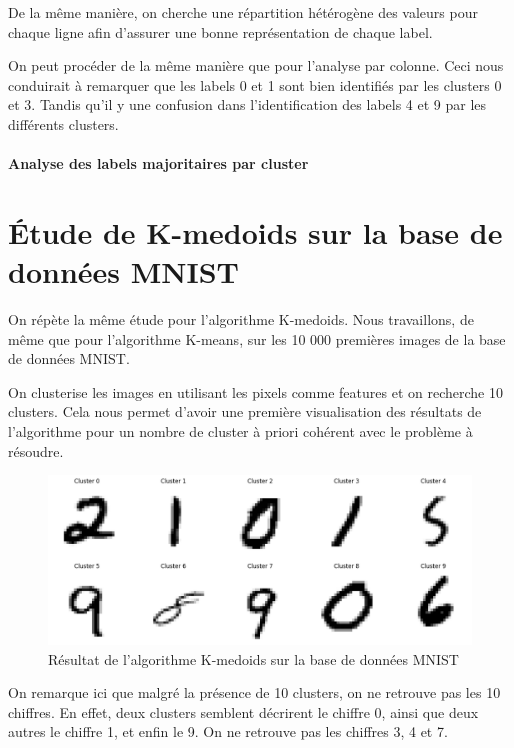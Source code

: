 \documentclass[french,a4paper,18pt]{article}
\begin{document}
De la même manière, on cherche une répartition hétérogène des valeurs pour chaque ligne
afin d'assurer une bonne représentation de chaque label.

On peut procéder de la même manière que pour l'analyse par colonne. 
Ceci nous conduirait à remarquer que les labels 0 et 1 sont bien identifiés
par les clusters 0 et 3.
Tandis qu'il y une confusion dans l'identification des labels 4 et 9 par les différents clusters.

\paragraph{Analyse des labels majoritaires par cluster}



\section{Étude de K-medoids sur la base de données MNIST}

On répète la même étude pour l'algorithme K-medoids. Nous travaillons, de même que pour l'algorithme K-means, 
sur les 10 000 premières images de la base de données MNIST.

On clusterise les images en utilisant les pixels comme features et on recherche 10 clusters.
Cela nous permet d'avoir une première visualisation des résultats de l'algorithme pour un nombre 
de cluster à priori cohérent avec le problème à résoudre.

\begin{figure}[h!]
    \centering
    \includegraphics[scale=0.25]{images/mnist_kmedoids_ten_clusters.png}
    \caption{Résultat de l'algorithme K-medoids sur la base de données MNIST}\label{fig:mnist_kmedoids}
\end{figure}

On remarque ici que malgré la présence de 10 clusters, on ne retrouve pas les 10 chiffres.
En effet, deux clusters semblent décrirent le chiffre 0, ainsi que deux autres le chiffre 1, et enfin le 9.
On ne retrouve pas les chiffres 3, 4 et 7.
\end{document}
